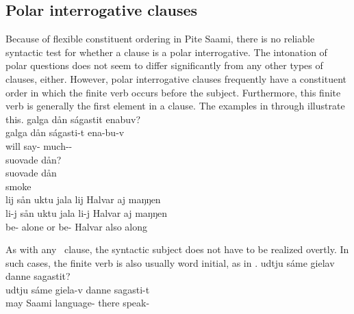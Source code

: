 \subsection{Polar interrogative clauses}\label{polarQs}
Because of flexible constituent ordering in Pite Saami, there is no reliable syntactic test for whether a clause is a polar interrogative. The intonation of polar questions does not seem to differ significantly from any other types of clauses, either. 
However, polar interrogative clauses frequently have a constituent order in which the finite verb occurs before the subject. 
Furthermore, this finite verb is generally the first element in a clause. The examples in  through  illustrate this.
\ea\label{polarQinversion1}%
\glll	galga dån ságastit enabuv?\\
	galga dån ságasti-t ena-bu-v\\
	will\BS{}  say- much--\\\nopagebreak
{} 
\z
\ea\label{polarQinversion2}%
\glll	suovade dån?\\
	suovade dån\\
	smoke\BS{} \\\nopagebreak
{} 
\z
\ea\label{polarQinversion3}%
\glll	lij sån uktu jala lij Halvar aj maŋŋen\\
	li-j sån uktu jala li-j Halvar aj maŋŋen\\
	be-  alone or be- Halvar\BS{} also along\\\nopagebreak
{} 
\z

As with any \PS\ clause, the syntactic subject does not have to be realized overtly. In such cases, the finite verb is also usually word initial, as in . 
\ea\label{polarQinversion4}%
\glll	udtju sáme gielav danne sagastit?\\
	udtju sáme giela-v danne sagasti-t\\
	may\BS{} Saami\BS{} language- there speak-\\\nopagebreak
{} 
\z

